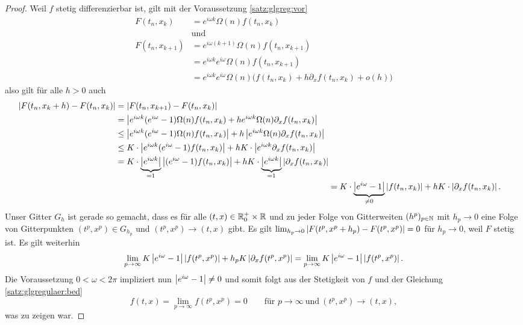 \begin{proof}
Weil $f$ stetig differenzierbar ist, gilt mit der Voraussetzung \eqref{satz:glgreg:vor}
\begin{align*}
F(t_n, x_k) &= e^{i \omega k} \Omega(n) f(t_n, x_k)\\
&\text{und}\\
F(t_n, x_{k+1}) &= e^{i \omega (k + 1)} \Omega(n) f(t_n, x_{k+1})\\
&= e^{i \omega k} e^{i \omega} \Omega(n) f(t_n, x_{k+1})\\
&= e^{i \omega k} e^{i \omega} \Omega(n) \bigl( f(t_n, x_k) + h \partial_x f(t_n, x_k) + o(h) \bigr)
\end{align*}
also gilt für alle $h > 0$ auch
\begin{align}
\begin{split}\nonumber
\left| F(t_n, x_k + h) - F(t_n, x_k) \right| &= \left| F(t_n, x_{k+1}) - F(t_n, x_k) \right|\\
&= \left| e^{i \omega k} (e^{i \omega} - 1) \Omega(n) f(t_n, x_k) + h e^{i \omega k} \Omega(n) \partial_x f(t_n, x_k) \right|\\
&\leq \left|  e^{i \omega k} (e^{i \omega} - 1) \Omega(n) f(t_n, x_k)  \right|  + h  \left|  e^{i \omega k} \Omega(n) \partial_x f(t_n, x_k)  \right|\\
&\leq K \cdot \left|  e^{i \omega k} (e^{i \omega} - 1) f(t_n, x_k)  \right|  + h  K \cdot \left|  e^{i \omega k} \partial_x f(t_n, x_k)  \right|\\
&= K \cdot \underbrace{\left|  e^{i \omega k}  \right|}_{= 1} \left|  (e^{i \omega} - 1) f(t_n, x_k)  \right| + hK \cdot  \underbrace{\left|  e^{i \omega k}  \right|}_{= 1} \left|  \partial_x f(t_n, x_k)  \right|
\end{split}\\ \label{satz:glgregulaer:bed}
&= K \cdot \underbrace{\left| e^{i \omega} - 1 \right|}_{\neq 0} \left| f(t_n, x_k) \right| + hK \cdot \left| \partial_x f(t_n, x_k) \right|.
\end{align}
Unser Gitter $G_h$ ist gerade so gemacht, dass es für alle $(t,x) \in \mathbb R^+_0 \times \mathbb R$ und zu jeder Folge von Gitterweiten $(h^p)_{p \in \mathbb N}$ mit $h_p \to 0$ eine Folge von Gitterpunkten $(t^p, x^p) \in G_{h_p}$ und $(t^p, x^p) \to (t,x)$ gibt.
Es gilt $\lim_{h_p \to 0} \left| F(t^p, x^p + h_p) - F(t^p, x^p) \right| = 0$ für $h_p \to 0$, weil $F$ stetig ist.
Es gilt weiterhin
\[ \lim_{p \to \infty} K\left| e^{i \omega} - 1 \right| \left| f(t^p, x^p) \right| + h_pK \left| \partial_x f(t^p, x^p) \right| = \lim_{p \to \infty} K \left| e^{i \omega} - 1 \right| \left| f(t^p, x^p) \right|. \]
Die Voraussetzung $0 < \omega < 2 \pi$ impliziert nun $\left| e^{i \omega} - 1 \right| \neq 0$ und somit folgt aus der Stetigkeit von $f$ und der Gleichung \eqref{satz:glgregulaer:bed}
\[ f(t,x) = \lim_{p \to \infty} f(t^p, x^p) = 0 \qquad \text{für } p \to \infty \: \text{und} \: (t^p, x^p) \to (t,x), \]
was zu zeigen war.
\end{proof}
